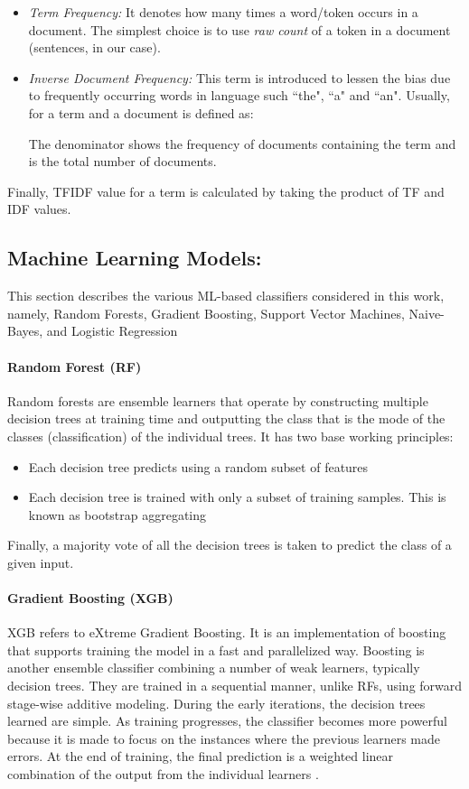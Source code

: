 \documentclass[conference]{IEEEtran}
\begin{document}
\begin{itemize}
    \item \textit{Term Frequency:} It denotes how many times a word/token occurs in a document. The simplest choice is to use \textit{raw count} of a token in a document (sentences, in our case).
    \item \textit{Inverse Document Frequency:} This term is introduced to lessen the bias due to frequently occurring words in language such ``the", ``a" and ``an". Usually,  for a term  and a document  is defined as:
    
    The denominator shows the frequency of documents containing the term  and  is the total number of documents.
\end{itemize}

Finally, TFIDF value for a term is calculated by taking the product of TF and IDF values.

\subsection{Machine Learning Models:} This section describes the various ML-based classifiers considered in this work, namely, Random Forests, Gradient Boosting, Support Vector Machines, Naive-Bayes, and Logistic Regression
\paragraph{Random Forest (RF)} Random forests are ensemble learners that operate by constructing multiple decision trees at training time and outputting the class that is the mode of the classes (classification) of the individual trees. It has two base working principles:

\begin{itemize}
    \item Each decision tree predicts using a random subset of features \cite{amit1997joint}
    \item Each decision tree is trained with only a subset of training samples. This is known as bootstrap aggregating \cite{breiman1996bagging}
\end{itemize}

Finally, a majority vote of all the decision trees is taken to predict the class of a given input.
\paragraph{Gradient Boosting (XGB)} XGB refers to eXtreme Gradient Boosting. It is an implementation of boosting that supports training the model in a fast and parallelized way. Boosting is another ensemble classifier combining a number of weak learners, typically decision trees. They are trained in a sequential manner, unlike RFs, using forward stage-wise additive modeling. During the early iterations, the decision trees learned are simple. As training progresses, the classifier becomes more powerful because it is made to focus on the instances where the previous learners made errors. At the end of training, the final prediction is a weighted linear combination of the output from the individual learners \cite{friedman2001elements}.
\end{document}
